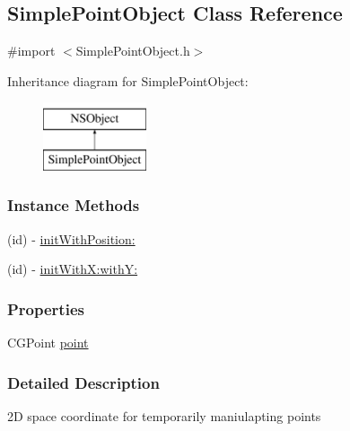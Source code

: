 \hypertarget{interface_simple_point_object}{\subsection{Simple\-Point\-Object Class Reference}
\label{d8/d8e/interface_simple_point_object}
}


{\ttfamily \#import $<$Simple\-Point\-Object.\-h$>$}

Inheritance diagram for Simple\-Point\-Object\-:\begin{figure}[H]
\begin{center}
\leavevmode
\includegraphics[height=2.000000cm]{d8/d8e/interface_simple_point_object}
\end{center}
\end{figure}
\subsubsection*{Instance Methods}
\begin{DoxyCompactItemize}
\item 
(id) -\/ \hyperlink{interface_simple_point_object_aa5ee92b5c2b007401904a3faefefcd76}{init\-With\-Position\-:}
\item 
(id) -\/ \hyperlink{interface_simple_point_object_ac92f127e890c45727110d3d5dd23b2a6}{init\-With\-X\-:with\-Y\-:}
\end{DoxyCompactItemize}
\subsubsection*{Properties}
\begin{DoxyCompactItemize}
\item 
C\-G\-Point \hyperlink{interface_simple_point_object_a9796a8e6a00e61bb255f59a80aef77d4}{point}
\end{DoxyCompactItemize}


\subsubsection{Detailed Description}
2\-D space coordinate for temporarily maniulapting points 

